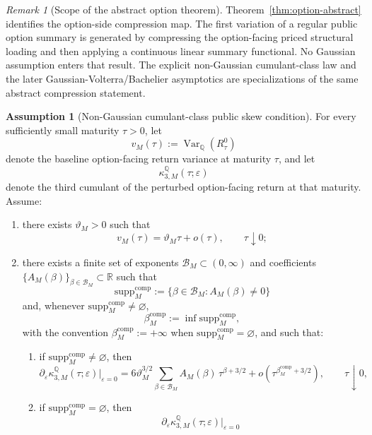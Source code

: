 \documentclass[11pt,a4paper]{amsart}
\theoremstyle{plain}
\theoremstyle{definition}
\newtheorem{assumption}[theorem]{Assumption}
\theoremstyle{remark}
\newtheorem{remark}[theorem]{Remark}
\DeclareMathOperator{\Var}{Var}
\newcommand{\R}{\mathbb{R}}
\newcommand{\QQ}{\mathbb{Q}}
\begin{document}
\begin{remark}[Scope of the abstract option theorem]
Theorem~\ref{thm:option-abstract} identifies the option-side compression map.  The first variation
of a regular public option summary is generated by compressing the option-facing priced structural
loading and then applying a continuous linear summary functional.  No Gaussian assumption enters
that result.  The explicit non-Gaussian cumulant-class law and the later
Gaussian-Volterra/Bachelier asymptotics are specializations of the same abstract compression
statement.
\end{remark}

\begin{assumption}[Non-Gaussian cumulant-class public skew condition]\label{ass:cumulant-class}
For every sufficiently small maturity \(\tau>0\), let
\[
        v_M(\tau):=\Var_\QQ(R_\tau^0)
\]
denote the baseline option-facing return variance at maturity \(\tau\), and let
\[
        \kappa_{3,M}^\QQ(\tau;\varepsilon)
\]
denote the third cumulant of the perturbed option-facing return at that maturity.  Assume:
\begin{enumerate}[label=(\roman*)]
\item there exists \(\vartheta_M>0\) such that
\[
        v_M(\tau)=\vartheta_M \tau + o(\tau),
        \qquad
        \tau\downarrow0;
\]
\item there exists a finite set of exponents \(\mathcal B_M\subset(0,\infty)\) and coefficients
\(\{A_M(\beta)\}_{\beta\in\mathcal B_M}\subset\R\) such that
\[
        \mathrm{supp}^{\mathrm{comp}}_M
        :=
        \{\beta\in\mathcal B_M:A_M(\beta)\neq0\}
\]
and, whenever \(\mathrm{supp}^{\mathrm{comp}}_M\neq\varnothing\),
\[
        \beta_M^{\mathrm{comp}}
        :=
        \inf \mathrm{supp}^{\mathrm{comp}}_M,
\]
with the convention \(\beta_M^{\mathrm{comp}}:=+\infty\) when
\(\mathrm{supp}^{\mathrm{comp}}_M=\varnothing\), and such that:
\begin{enumerate}[label=(\alph*)]
\item if \(\mathrm{supp}^{\mathrm{comp}}_M\neq\varnothing\), then
\[
        \partial_\varepsilon \kappa_{3,M}^\QQ(\tau;\varepsilon)\big|_{\varepsilon=0}
        =
        6\vartheta_M^{3/2}
        \sum_{\beta\in\mathcal B_M}
        A_M(\beta)\,\tau^{\beta+3/2}
        +
        o\!\left(\tau^{\beta_M^{\mathrm{comp}}+3/2}\right),
        \qquad
        \tau\downarrow0,
\]
\item if \(\mathrm{supp}^{\mathrm{comp}}_M=\varnothing\), then
\[
        \partial_\varepsilon \kappa_{3,M}^\QQ(\tau;\varepsilon)\big|_{\varepsilon=0}
\]
\end{enumerate}
\end{enumerate}
\end{assumption}
\end{document}
